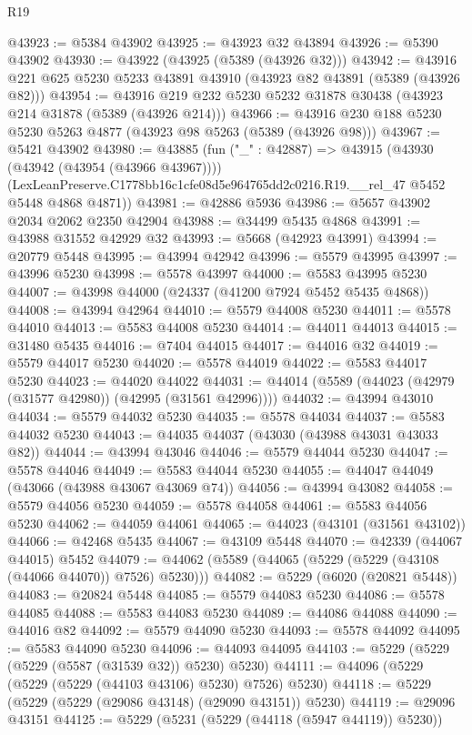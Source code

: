 \begin{lexlean}{R19}
\begin{coremodule}
@43923 := @5384 @43902
@43925 := @43923 @32 @43894
@43926 := @5390 @43902
@43930 := @43922 (@43925 (@5389 (@43926 @32)))
@43942 := @43916 @221 @625 @5230 @5233 @43891 @43910 (@43923 @82 @43891 (@5389 (@43926 @82)))
@43954 := @43916 @219 @232 @5230 @5232 @31878 @30438 (@43923 @214 @31878 (@5389 (@43926 @214)))
@43966 := @43916 @230 @188 @5230 @5230 @5263 @4877 (@43923 @98 @5263 (@5389 (@43926 @98)))
@43967 := @5421 @43902
@43980 := @43885
    (fun ("_" : @42887) =>
    @43915
      (@43930 (@43942 (@43954 (@43966 @43967))))
      (LexLeanPreserve.C1778bb16c1cfe08d5e964765dd2c0216.R19.__rel_47 @5452 @5448 @4868 @4871))
@43981 := @42886 @5936
@43986 := @5657 @43902 @2034 @2062 @2350 @42904
@43988 := @34499 @5435 @4868
@43991 := @43988 @31552 @42929 @32
@43993 := @5668 (@42923 @43991)
@43994 := @20779 @5448
@43995 := @43994 @42942
@43996 := @5579 @43995
@43997 := @43996 @5230
@43998 := @5578 @43997
@44000 := @5583 @43995 @5230
@44007 := @43998 @44000 (@24337 (@41200 @7924 @5452 @5435 @4868))
@44008 := @43994 @42964
@44010 := @5579 @44008 @5230
@44011 := @5578 @44010
@44013 := @5583 @44008 @5230
@44014 := @44011 @44013
@44015 := @31480 @5435
@44016 := @7404 @44015
@44017 := @44016 @32
@44019 := @5579 @44017 @5230
@44020 := @5578 @44019
@44022 := @5583 @44017 @5230
@44023 := @44020 @44022
@44031 := @44014 (@5589 (@44023 (@42979 (@31577 @42980)) (@42995 (@31561 @42996))))
@44032 := @43994 @43010
@44034 := @5579 @44032 @5230
@44035 := @5578 @44034
@44037 := @5583 @44032 @5230
@44043 := @44035 @44037 (@43030 (@43988 @43031 @43033 @82))
@44044 := @43994 @43046
@44046 := @5579 @44044 @5230
@44047 := @5578 @44046
@44049 := @5583 @44044 @5230
@44055 := @44047 @44049 (@43066 (@43988 @43067 @43069 @74))
@44056 := @43994 @43082
@44058 := @5579 @44056 @5230
@44059 := @5578 @44058
@44061 := @5583 @44056 @5230
@44062 := @44059 @44061
@44065 := @44023 (@43101 (@31561 @43102))
@44066 := @42468 @5435
@44067 := @43109 @5448
@44070 := @42339 (@44067 @44015) @5452
@44079 := @44062 (@5589 (@44065 (@5229 (@5229 (@43108 (@44066 @44070)) @7526) @5230)))
@44082 := @5229 (@6020 (@20821 @5448))
@44083 := @20824 @5448
@44085 := @5579 @44083 @5230
@44086 := @5578 @44085
@44088 := @5583 @44083 @5230
@44089 := @44086 @44088
@44090 := @44016 @82
@44092 := @5579 @44090 @5230
@44093 := @5578 @44092
@44095 := @5583 @44090 @5230
@44096 := @44093 @44095
@44103 := @5229 (@5229 (@5229 (@5587 (@31539 @32)) @5230) @5230)
@44111 := @44096 (@5229 (@5229 (@5229 (@44103 @43106) @5230) @7526) @5230)
@44118 := @5229 (@5229 (@5229 (@29086 @43148) (@29090 @43151)) @5230)
@44119 := @29096 @43151
@44125 := @5229 (@5231 (@5229 (@44118 (@5947 @44119)) @5230))

\end{coremodule}
\end{lexlean}
